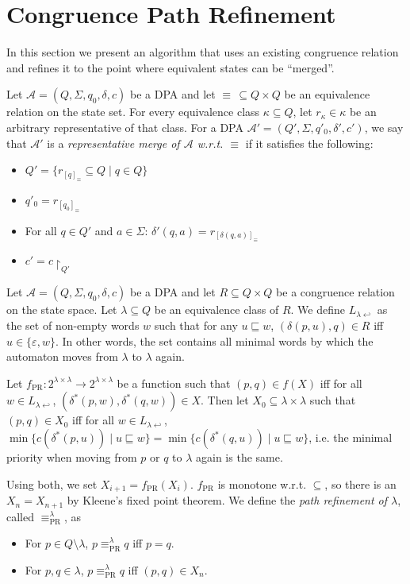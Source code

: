 
\section{Congruence Path Refinement}

In this section we present an algorithm that uses an existing congruence relation and refines it to the point where equivalent states can be \enquote{merged}.

\begin{defn}
	Let $\mathcal{A} = (Q, \Sigma, q_0, \delta, c)$ be a DPA and let $\equiv \,\subseteq Q \times Q$ be an equivalence relation on the state set. For every equivalence class $\kappa \subseteq Q$, let $r_\kappa \in \kappa$ be an arbitrary representative of that class. For a DPA $\mathcal{A}' = (Q', \Sigma, q'_0, \delta', c')$, we say that $\mathcal{A}'$ is a \emph{representative merge of $\mathcal{A}$ w.r.t. $\equiv$} if it satisfies the following:
	\begin{itemize}
		\item $Q' = \{ r_{[q]_\equiv} \subseteq Q \mid q \in Q \}$
		\item $q'_0 = r_{[q_0]_\equiv}$
		\item For all $q \in Q'$ and $a \in \Sigma$: $\delta'(q, a) = r_{[\delta(q, a)]_\equiv}$
		\item $c' = c\upharpoonright_{Q'}$
	\end{itemize}
\end{defn}

\begin{defn}
	Let $\mathcal{A} = (Q, \Sigma, q_0, \delta, c)$ be a DPA and let $R \subseteq Q \times Q$ be a congruence relation on the state space. Let $\lambda \subseteq Q$ be an equivalence class of $R$. We define $L_{\lambda \hookleftarrow}$ as the set of non-empty words $w$ such that for any $u \sqsubseteq w$, $(\delta(p, u), q) \in R$ iff $u \in \{\varepsilon, w\}$. In other words, the set contains all minimal words by which the automaton moves from $\lambda$ to $\lambda$ again.
	
	Let $f_\text{PR} : 2^{\lambda \times \lambda} \rightarrow 2^{\lambda \times \lambda}$ be a function such that $(p, q) \in f(X)$  iff for all $w \in L_{\lambda \hookleftarrow}$, $(\delta^*(p, w), \delta^*(q, w)) \in X$.
	Then let $X_0 \subseteq \lambda \times \lambda$ such that $(p, q) \in X_0$ iff for all $w \in L_{\lambda \hookleftarrow}$, $\min \{ c(\delta^*(p, u)) \mid u \sqsubseteq w \} = \min \{ c(\delta^*(q, u)) \mid u \sqsubseteq w \}$, i.e. the minimal priority when moving from $p$ or $q$ to $\lambda$ again is the same.
	
	Using both, we set $X_{i+1} = f_\text{PR}(X_i)$. $f_\text{PR}$ is monotone w.r.t. $\subseteq$, so there is an $X_n = X_{n+1}$ by Kleene's fixed point theorem. We define the \emph{path refinement of $\lambda$}, called $\equiv_\text{PR}^\lambda$, as
	\begin{itemize}
		\item For $p \in Q \setminus \lambda$, $p \equiv_\text{PR}^\lambda q$ iff $p = q$.
		\item For $p, q \in \lambda$, $p \equiv_\text{PR}^\lambda q$ iff $(p, q) \in X_n$.
	\end{itemize}
\end{defn}


